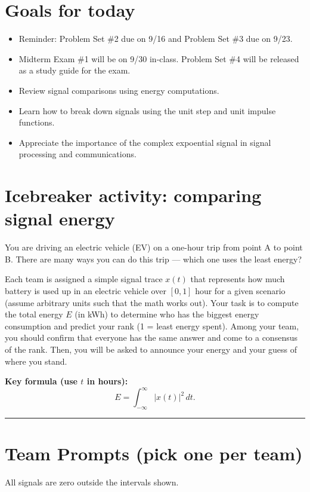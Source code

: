 
\section{Goals for today}
\begin{itemize}
    \item Reminder: Problem Set \#2 due on 9/16 and Problem Set \#3 due on 9/23.
    \item Midterm Exam \#1 will be on 9/30 in-class. Problem Set \#4 will be released as a study guide for the exam.
    \item Review signal comparisons using energy computations.
    \item Learn how to break down signals using the unit step and unit impulse functions.
    \item Appreciate the importance of the complex expoential signal in signal processing and communications.
\end{itemize}

\section{Icebreaker activity: comparing signal energy}
You are driving an electric vehicle (EV) on a one-hour trip from point A to point B. There are many ways you can do this trip --- which one uses the least energy?
\medskip

\noindent Each team is assigned a simple signal trace \(x(t)\)  that represents how much battery is used up in an electric vehicle over \([0,1]\) hour for a given scenario (assume arbitrary units such that the math works out). Your task is to compute the total energy \(E\) (in \si{kWh}) to determine who has the biggest energy consumption and predict your rank (1 = least energy spent). Among your team, you should confirm that everyone has the same answer and come to a consensus of the rank. Then, you will be asked to announce your energy and your guess of where you stand.

\medskip

\textbf{Key formula (use \(t\) in hours):}
\[
E  = \int_{-\infty}^{\infty} |x(t)|^2 \,dt.
\]

\bigskip
\hrule
\bigskip

\section*{Team Prompts (pick one per team)}
All signals are zero outside the intervals shown.

